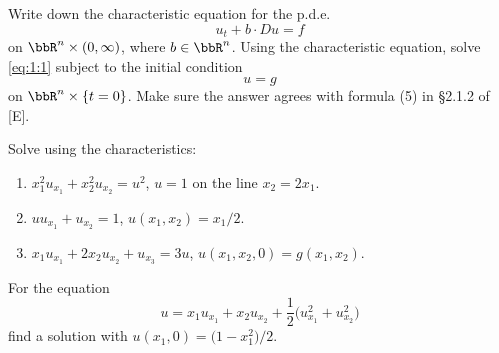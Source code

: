 \begin{problem}
  Write down the characteristic equation for the p.d.e.\@
  \[
    \label{eq:1:1}
    \tag{\(*\)}
    u_t+b\cdot Du=f
  \]
  on \(\bbR^n\times(0,\infty)\), where \(b\in\bbR^n\). Using the
  characteristic equation, solve \eqref{eq:1:1} subject to the initial
  condition
  \[
    u=g
  \]
  on \(\bbR^n\times\{t=0\}\). Make sure the answer agrees with formula (5)
  in \S 2.1.2 of [E].
\end{problem}
\begin{solution}

\end{solution}
\newpage

\begin{problem}
  Solve using the characteristics:
  \begin{enumerate}[label=(\alph*)]
  \item \(x_1^2u_{x_1}+x_2^2u_{x_2}=u^2\), \(u=1\) on the line
    \(x_2=2x_1\).
  \item \(uu_{x_1}+u_{x_2}=1\), \(u(x_1,x_2)=x_1/2\).
  \item \(x_1u_{x_1}+2x_2u_{x_2}+u_{x_3}=3u\),
    \(u(x_1,x_2,0)=g(x_1,x_2)\).
  \end{enumerate}
\end{problem}
\begin{solution}

\end{solution}
\newpage

\begin{problem}
  For the equation
  \[
    u=x_1u_{x_1}+x_2u_{x_2}
    +\frac{1}{2}\bigl(u_{x_1}^2+u_{x_2}^2\bigr)
  \]
  find a solution with \(u(x_1,0)=\bigl(1-x_1^2\bigr)/2\).
\end{problem}
\begin{solution}

\end{solution}

